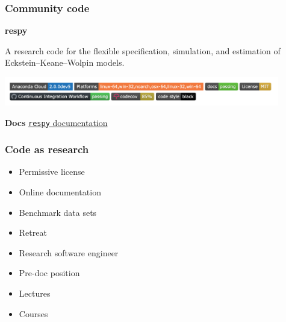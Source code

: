 \begin{frame}\frametitle{Community code}

\vspace{0.3cm}\textbf{\hspace{0.05cm} {\Large respy}}\vspace{0.50cm}

A research code for the flexible specification, simulation, and estimation of Eckstein--Keane--Wolpin models.\\\vspace{0.65cm}

\includegraphics[width=0.9\textwidth]{material/crop-respy-engineering.png}\\\vspace{0.65cm}

\textbf{Docs} \hspace{0.25cm} \href{https://respy.readthedocs.io/en/latest/}{\texttt{respy} documentation}

\end{frame}
\begin{frame}\frametitle{Code as research}


  \begin{multicols}{2}
    \vspace{0.3cm}
    \begin{itemize}\setlength\itemsep{1em}
      \item Permissive license
      \item Online documentation
      \item Benchmark data sets
      \item Retreat
    \end{itemize}

    \pause

    \vspace{0.3cm}
    \begin{itemize}\setlength\itemsep{1em}
      \item Research software engineer
      \item Pre-doc position
      \item Lectures
      \item Courses
  \end{itemize}
  \end{multicols}

\end{frame}
